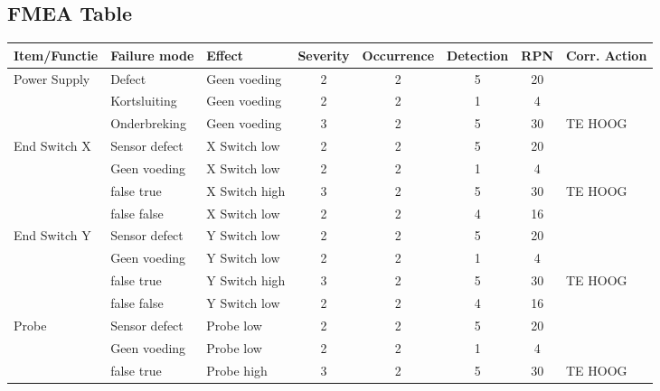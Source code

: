\documentclass{article}
\begin{document}
\newpage
\begin{landscape}
    \subsection{FMEA Table} 
    \begin{longtable}{|l|l|l|c|c|c|c|l|}
        \hline
        \textbf{Item/Functie} & \textbf{Failure mode} & \textbf{Effect} & \textbf{Severity} & \textbf{Occurrence} & \textbf{Detection} & \textbf{RPN} & \textbf{Corr. Action} \\ \hline
        \multirow{3}{*}{Power Supply}       & Defect            & Geen voeding  & 2 & 2 & 5 & 20 & \\
                                            & Kortsluiting      & Geen voeding  & 2 & 2 & 1 &  4 & \\
                                            & Onderbreking      & Geen voeding  & 3 & 2 & 5 & 30 & TE HOOG \\
                                            \hline
        \multirow{4}{*}{End Switch X}       & Sensor defect     & X Switch low  & 2 & 2 & 5 & 20 & \\
                                            & Geen voeding      & X Switch low  & 2 & 2 & 1 &  4 & \\
                                            & false true        & X Switch high & 3 & 2 & 5 & 30 & TE HOOG \\
                                            & false false       & X Switch low  & 2 & 2 & 4 & 16 & \\ 
                                            \hline
        \multirow{4}{*}{End Switch Y}       & Sensor defect     & Y Switch low  & 2 & 2 & 5 & 20 & \\
                                            & Geen voeding      & Y Switch low  & 2 & 2 & 1 &  4 & \\
                                            & false true        & Y Switch high & 3 & 2 & 5 & 30 & TE HOOG \\
                                            & false false       & Y Switch low  & 2 & 2 & 4 & 16 & \\ 
                                            \hline
        \multirow{4}{*}{Probe}              & Sensor defect     & Probe low  & 2 & 2 & 5 & 20 & \\
                                            & Geen voeding      & Probe low  & 2 & 2 & 1 &  4 & \\
                                            & false true        & Probe high & 3 & 2 & 5 & 30 & TE HOOG \\

\end{longtable}
\end{landscape}
\end{document}
